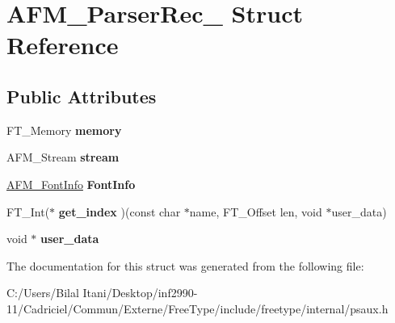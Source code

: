 \hypertarget{struct_a_f_m___parser_rec__}{}\section{A\+F\+M\+\_\+\+Parser\+Rec\+\_\+ Struct Reference}
\label{struct_a_f_m___parser_rec__}
\subsection*{Public Attributes}
\begin{DoxyCompactItemize}
\item 
F\+T\+\_\+\+Memory {\bfseries memory}\hypertarget{struct_a_f_m___parser_rec___a3fec8b1760fa9261f48ee87dc2b3858b}{}\label{struct_a_f_m___parser_rec___a3fec8b1760fa9261f48ee87dc2b3858b}

\item 
A\+F\+M\+\_\+\+Stream {\bfseries stream}\hypertarget{struct_a_f_m___parser_rec___adf3b1165216cbd1f7ec7ae736fd4270a}{}\label{struct_a_f_m___parser_rec___adf3b1165216cbd1f7ec7ae736fd4270a}

\item 
\hyperlink{struct_a_f_m___font_info_rec__}{A\+F\+M\+\_\+\+Font\+Info} {\bfseries Font\+Info}\hypertarget{struct_a_f_m___parser_rec___ae53d6cddac32a0eb7014c3a9f74517df}{}\label{struct_a_f_m___parser_rec___ae53d6cddac32a0eb7014c3a9f74517df}

\item 
F\+T\+\_\+\+Int($\ast$ {\bfseries get\+\_\+index} )(const char $\ast$name, F\+T\+\_\+\+Offset len, void $\ast$user\+\_\+data)\hypertarget{struct_a_f_m___parser_rec___a9d33b62410351d72878f0f14007e7385}{}\label{struct_a_f_m___parser_rec___a9d33b62410351d72878f0f14007e7385}

\item 
void $\ast$ {\bfseries user\+\_\+data}\hypertarget{struct_a_f_m___parser_rec___a9fa78a781737bf27e00448c5092b7657}{}\label{struct_a_f_m___parser_rec___a9fa78a781737bf27e00448c5092b7657}

\end{DoxyCompactItemize}


The documentation for this struct was generated from the following file\+:\begin{DoxyCompactItemize}
\item 
C\+:/\+Users/\+Bilal Itani/\+Desktop/inf2990-\/11/\+Cadriciel/\+Commun/\+Externe/\+Free\+Type/include/freetype/internal/psaux.\+h\end{DoxyCompactItemize}
